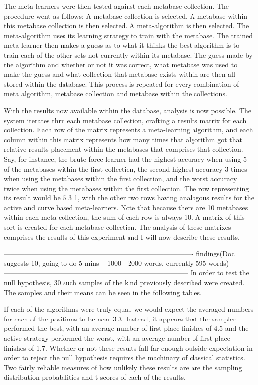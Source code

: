 The meta-learners were then tested against each metabase collection. The procedure
went as follows: A metabase collection is selected. A metabase within this
metabase collection is then selected. A meta-algorithm is then selected. The
meta-algorithm uses its learning strategy to train with the metabase. The
trained meta-learner then makes a guess as to what it thinks the best algorithm
is to train each of the other sets not currently within its metabase. The guess
made by the algorithm and whether or not it was correct, what metabase was used
to make the guess and what collection that metabase exists within are then all
stored within the database. This process is repeated for every combination of
meta algorithm, metabase collection and metabase within the collections.

With the results now available within the database, analysis is now possible.
The system iterates thru each metabase collection, crafting a results matrix
for each collection. Each row of the matrix represents a meta-learning
algorithm, and each column within this matrix represents how many times
that algorithm got that relative results placement within the metabases that
comprises that collection. Say, for instance, the brute force learner had
the highest accuracy when using 5 of the metabases within the first collection,
the second highest accuracy 3 times when using the metabases within the first
collection, and the worst accuracy twice when using the metabases within the
first collection. The row representing its result would be 5 3 1, with the
other two rows having analogous results for the active and curve based
meta-learners. Note that because there are 10 metabases within each
meta-collection, the sum of each row is always 10. A matrix of this sort is
created for each metabase collection. The analysis of these matrixes comprises
the results of this experiment and I will now describe these results.


----------------------------------------------------------------------------------
findings(Doc suggests 10, going to do 5 mins ~ 1000 - 2000 words, currently 595
words)
--------------------------------------------------------------------------------
In order to test the null hypothesis, 30 such samples of the kind previously
described were created. The samples and their means can be seen in the following
tables.

If each of the algorithms were truly equal, we would expect the averaged numbers
for each of the positions to be near 3.3. Instead, it appears that the sampler
performed the best, with an average number of first place finishes of 4.5 and the
active strategy performed the worst, with an average number of first place
finishes of 1.7. Whether or not these results fall far enough outside
expectation in order to reject the null hypothesis requires the machinary of
classical statistics. Two fairly reliable measures of how unlikely these results
are are the sampling distribution probabilities and t scores of each of the
results.

